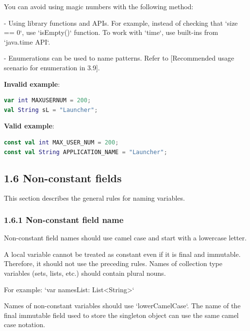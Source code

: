 You can avoid using magic numbers with the following method:

- Using library functions and APIs. For example, instead of checking that `size == 0`, use `isEmpty()` function. To work with `time`, use built-ins from `java.time API`.

- Enumerations can be used to name patterns. Refer to [Recommended usage scenario for enumeration in 3.9].



\textbf{Invalid example}: 



\begin{lstlisting}[language=Kotlin]
var int MAXUSERNUM = 200;
val String sL = "Launcher";
\end{lstlisting}


\textbf{Valid example}:



\begin{lstlisting}[language=Kotlin]
const val int MAX_USER_NUM = 200;
const val String APPLICATION_NAME = "Launcher";
\end{lstlisting}


\subsection*{\textbf{1.6 Non-constant fields}}

\label{sec:1.6}

This section describes the general rules for naming variables.

\subsubsection*{\textbf{1.6.1 Non-constant field name}}
\leavevmode\newline

\label{sec:1.6.1}

Non-constant field names should use camel case and start with a lowercase letter.

A local variable cannot be treated as constant even if it is final and immutable. Therefore, it should not use the preceding rules. Names of collection type variables (sets, lists, etc.) should contain plural nouns.

For example: `var namesList: List<String>`



Names of non-constant variables should use `lowerCamelCase`. The name of the final immutable field used to store the singleton object can use the same camel case notation.



